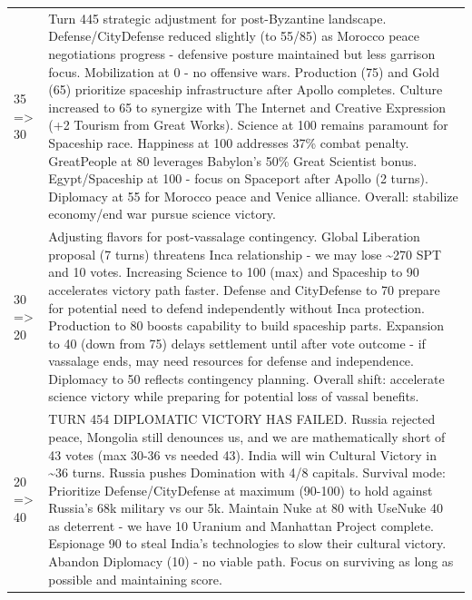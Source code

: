 \begin{longtable}{p{}p{}}
35 => 30 & Turn 445 strategic adjustment for post-Byzantine landscape. Defense/CityDefense reduced slightly (to 55/85) as Morocco peace negotiations progress - defensive posture maintained but less garrison focus. Mobilization at 0 - no offensive wars. Production (75) and Gold (65) prioritize spaceship infrastructure after Apollo completes. Culture increased to 65 to synergize with The Internet and Creative Expression (+2 Tourism from Great Works). Science at 100 remains paramount for Spaceship race. Happiness at 100 addresses 37\% combat penalty. GreatPeople at 80 leverages Babylon's 50\% Great Scientist bonus. Egypt/Spaceship at 100 - focus on Spaceport after Apollo (2 turns). Diplomacy at 55 for Morocco peace and Venice alliance. Overall: stabilize economy/end war pursue science victory. \\
30 => 20 & Adjusting flavors for post-vassalage contingency. Global Liberation proposal (7 turns) threatens Inca relationship - we may lose \textasciitilde 270 SPT and 10 votes. Increasing Science to 100 (max) and Spaceship to 90 accelerates victory path faster. Defense and CityDefense to 70 prepare for potential need to defend independently without Inca protection. Production to 80 boosts capability to build spaceship parts. Expansion to 40 (down from 75) delays settlement until after vote outcome - if vassalage ends, may need resources for defense and independence. Diplomacy to 50 reflects contingency planning. Overall shift: accelerate science victory while preparing for potential loss of vassal benefits. \\
20 => 40 & TURN 454 DIPLOMATIC VICTORY HAS FAILED. Russia rejected peace, Mongolia still denounces us, and we are mathematically short of 43 votes (max 30-36 vs needed 43). India will win Cultural Victory in \textasciitilde 36 turns. Russia pushes Domination with 4/8 capitals. Survival mode: Prioritize Defense/CityDefense at maximum (90-100) to hold against Russia's 68k military vs our 5k. Maintain Nuke at 80 with UseNuke 40 as deterrent - we have 10 Uranium and Manhattan Project complete. Espionage 90 to steal India's technologies to slow their cultural victory. Abandon Diplomacy (10) - no viable path. Focus on surviving as long as possible and maintaining score. \\

\end{longtable}
